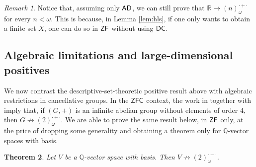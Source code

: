 \documentclass[10pt,a4paper]{amsart}
\newtheorem{theorem}{Theorem}[section]
\theoremstyle{definition}
\newcommand{\zf}{\mathnormal{\mathsf{ZF}}}
\newcommand{\dc}{\mathnormal{\mathsf{DC}}}
\newcommand{\ad}{\mathnormal{\mathsf{AD}}}
\newcommand{\zfc}{\mathnormal{\mathsf{ZFC}}}
\theoremstyle{remark}
\newtheorem{remark}[theorem]{Remark}
\numberwithin{equation}{section}
\begin{document}
\begin{remark}\label{rem:R-finite}
Notice that, assuming only $\ad$, we can still prove that $\mathbb{R}\to(n)^{\cdot+\cdot}_{\omega}$ for every $n<\omega$. This is because, in Lemma \ref{lem:hls}, if one only wants to obtain a finite set $X$, one can do so in $\zf$ without using $\dc$.
\end{remark}

\subsection{Algebraic limitations and large-dimensional positives}\label{subsec:owings-algebra}

We now contrast the descriptive-set-theoretic positive result above with algebraic restrictions in cancellative groups. In the $\zfc$ context, the work in \cite[Theorem 6]{FernandezSarmientoVera2024} together with \cite{LeaderWilliams2024} imply that, if $(G,+)$ is an infinite abelian group without elements of order $4$, then $G\not\to(2)^{\cdot+\cdot}_{\omega}$. We are able to prove the same result below, in $\zf$ only, at the price of dropping some generality and obtaining a theorem only for $\mathbb Q$-vector spaces with basis.

\begin{theorem}\label{thm:owings-Q-negative}
Let $V$ be a $\mathbb{Q}$-vector space with basis. 
Then $V\not\to(2)^{\cdot+\cdot}_{\omega}$.
\end{theorem}
\end{document}
